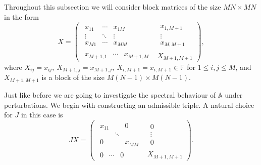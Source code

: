 \documentclass[14pt,a4paper]{extarticle}
\theoremstyle{definition}
\begin{document}
Throughout this subsection
    we will consider block matrices
    of the size \( {MN}{\times}{MN} \)
    in the form
    \[
    X =
        \left(\begin{array}{c|c}
            \begin{matrix}
                x_{11} & \cdots & x_{1M} \\
                \vdots & \ddots & \vdots \\
                x_{M1} & \cdots & x_{MM}
            \end{matrix} &
            \begin{matrix}
                x_{1,M+1} \\
                \vdots \\
                x_{M,M+1}
            \end{matrix} \\ \hline
            \begin{matrix}
                x_{M+1,1} &
                \cdots &
                x_{M+1,M}
            \end{matrix} &
            X_{M+1,M+1}
        \end{array}\right),
    \]
where
\( X_{ij}      {=} x_{ij},
 \ X_{M{+}1,j} {=} x_{M{+}1,j},
 \ X_{i,M{+}1} {=} x_{i,M{+}1} \in \mathbb{F} \)
for \( 1 \leq {i,j} \leq M \),
and
\( X_{M{+}1,M{+}1} \) is a block of the size \( {M(N{-}1){\times}M(N-1)} \).

Just like before we are going to investigate
    the spectral behaviour of \( \mathbb{A} \) under perturbations.
We begin with constructing an admissible triple.
A natural choice for \( J \) in this case is
\[
        J X =
        \left(\begin{array}{c|c}
            \begin{matrix}
                x_{11} &  & 0 \\
                 & \ddots &  \\
                0 &  & x_{MM}
            \end{matrix} &
            \begin{matrix}
                0 \\
                \vdots \\
                0
            \end{matrix} \\ \hline
            \begin{matrix}
                0 & \cdots & 0
            \end{matrix} &
            X_{M+1,M+1}
        \end{array}\right).
\]
\end{document}
